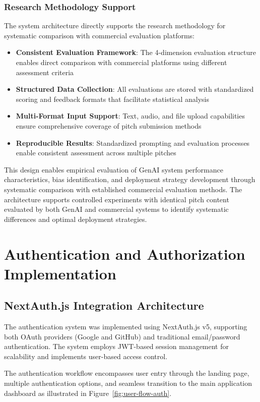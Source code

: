 \subsubsection{Research Methodology Support}
The system architecture directly supports the research methodology for systematic comparison with commercial evaluation platforms:

\begin{itemize}
  \item \textbf{Consistent Evaluation Framework}: The 4-dimension evaluation structure enables direct comparison with commercial platforms using different assessment criteria
  \item \textbf{Structured Data Collection}: All evaluations are stored with standardized scoring and feedback formats that facilitate statistical analysis
  \item \textbf{Multi-Format Input Support}: Text, audio, and file upload capabilities ensure comprehensive coverage of pitch submission methods
  \item \textbf{Reproducible Results}: Standardized prompting and evaluation processes enable consistent assessment across multiple pitches
\end{itemize}

This design enables empirical evaluation of GenAI system performance characteristics, bias identification, and deployment strategy development through systematic comparison with established commercial evaluation methods. The architecture supports controlled experiments with identical pitch content evaluated by both GenAI and commercial systems to identify systematic differences and optimal deployment strategies.


\section{Authentication and Authorization Implementation}

\subsection{NextAuth.js Integration Architecture}
The authentication system was implemented using NextAuth.js v5, supporting both OAuth providers (Google and GitHub) and traditional email/password authentication. The system employs JWT-based session management for scalability and implements user-based access control.

The authentication workflow encompasses user entry through the landing page, multiple authentication options, and seamless transition to the main application dashboard as illustrated in Figure~\ref{fig:user-flow-auth}.

